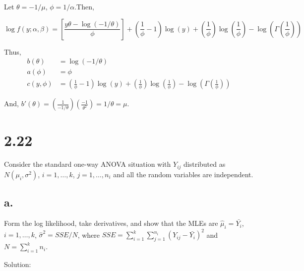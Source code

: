 \documentclass[
  letterpaper,
  DIV=11,
  numbers=noendperiod]{scrreprt}
\begin{document}
Let \(\theta = -1/\mu\), \(\phi = 1/\alpha\).Then,

\[
\log f(y;\alpha,\beta) = \left[ \frac{y\theta- \log \left(-1/\theta\right)}{\phi} \right]  +\left(\frac{1}{\phi}-1\right)\log(y)+\left(\frac{1}{\phi}\right) \log\left(\frac{1}{\phi}\right)-\log \left(\Gamma \left(\frac{1}{\phi}\right) \right)
\]

Thus, \[ \begin{aligned}
b(\theta) &= \log(-1/\theta) \\
a(\phi) &= \phi \\
c(y, \phi) &= \left(\frac{1}{\phi}-1\right)\log(y)+\left(\frac{1}{\phi}\right) \log\left(\frac{1}{\phi}\right)-\log \left(\Gamma \left(\frac{1}{\phi}\right) \right)
\end{aligned}
\]

And,
\(b'(\theta) = \left(\frac{1}{-1/\theta}\right)\left(\frac{-1}{\theta^2}\right) = 1/\theta = \mu\).

\newpage

\hypertarget{section-8}{%
\section{2.22}\label{section-8}}

Consider the standard one-way ANOVA situation with \(Y_{ij}\)
distributed as \(N(\mu_i,\sigma^2)\), \(i=1,\dots,k\), \(j=1,\dots,n_i\)
and all the random variables are independent.

\hypertarget{a.}{%
\subsection{a.}\label{a.}}

Form the log likelihood, take derivatives, and show that the MLEs are
\(\hat \mu_i = \bar{Y_i}\), \(i=1,\dots,k\), \(\hat \sigma^2 = SSE/N\),
where \(SSE= \sum_{i=1}^k \sum_{j=1}^{n_i} (Y_{ij}-\bar{Y_i})^2\) and
\(N=\sum_{i=1}^k n_i\).

Solution:
\end{document}
